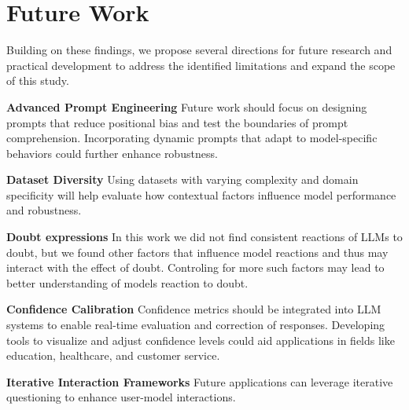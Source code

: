\section{Future Work}

Building on these findings, we propose several directions for future research and practical development to address the identified limitations and expand the scope of this study.

\textbf{Advanced Prompt Engineering}
Future work should focus on designing prompts that reduce positional bias and test the boundaries of prompt comprehension. Incorporating dynamic prompts that adapt to model-specific behaviors could further enhance robustness.


\textbf{Dataset Diversity}
Using datasets with varying complexity and domain specificity will help evaluate how contextual factors influence model performance and robustness.

\textbf{Doubt expressions}
In this work we did not find consistent reactions of LLMs to doubt, but we found other factors that influence model reactions and thus may interact with the effect of doubt. Controling for more such factors may lead to better understanding of models reaction to doubt. 

\textbf{Confidence Calibration}
Confidence metrics should be integrated into LLM systems to enable real-time evaluation and correction of responses. Developing tools to visualize and adjust confidence levels could aid applications in fields like education, healthcare, and customer service.

\textbf{Iterative Interaction Frameworks}
Future applications can leverage iterative questioning to enhance user-model interactions. 
